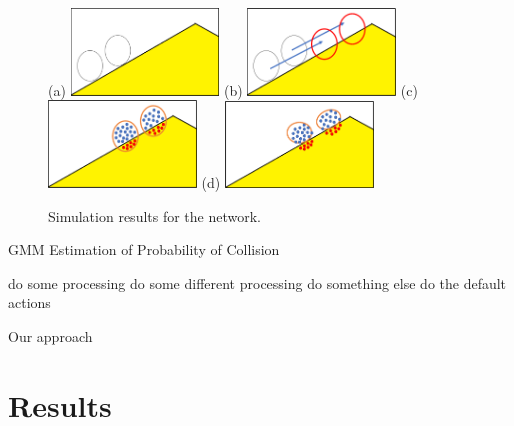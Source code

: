 \documentclass[journal]{IEEEtran}
\begin{document}
\begin{figure}[!t]
\centering
\subfloat (a) {\includegraphics[width=1.55in]{step1.png}%
\label{step_one}}
\hfil
\subfloat (b) {\includegraphics[width=1.55in]{step2.png}%
\label{step_two}}
\hfil
\subfloat (c) {\includegraphics[width=1.55in]{step3.png}%
\label{step_three}}
\hfil
\subfloat (d) {\includegraphics[width=1.55in]{step4.png}%
\label{step_four}}
\caption{Simulation results for the network.}
\label{algorithm_steps}
\end{figure}

\renewcommand{\algorithmicrequire}{\textbf{Input:}}
\renewcommand{\algorithmicensure}{\textbf{Output:}}

\begin{algorithm}
  \caption{GMM Estimation of Probability of Collision}
  \begin{algorithmic}[1]
    \REQUIRE{$[x_0^*,u_0^*,...,x_N^*,u_N^*]$}
      \STATE do some processing
      \STATE do some different processing
      \STATE do something else
    \ELSE
      \STATE do the default actions
    \ENDIF
  \end{algorithmic}
\end{algorithm}
Our approach


\section{Results}
\end{document}
